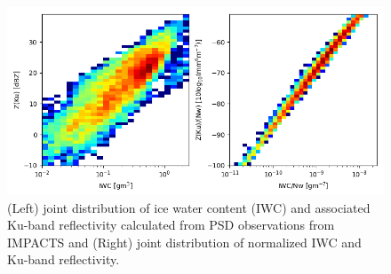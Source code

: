 \documentclass[10pt]{ietbook}
\begin{document}
\begin{figure}

\centerline{ }
\includegraphics[width=\textwidth]{normZvsnormIWC.png}

\caption{ (Left) joint distribution of ice water content (IWC) and associated Ku-band reflectivity calculated from PSD observations from IMPACTS and
(Right) joint distribution of normalized IWC and Ku-band reflectivity. }
\end{figure}


 









\end{document}
